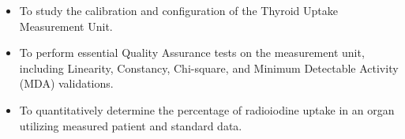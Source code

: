 \begin{itemize}
    \item To study the calibration and configuration of the Thyroid Uptake Measurement Unit.
    \item To perform essential Quality Assurance tests on the measurement unit, including Linearity, Constancy, Chi-square, and Minimum Detectable Activity (MDA) validations.
    \item To quantitatively determine the percentage of radioiodine uptake in an organ utilizing measured patient and standard data.
\end{itemize}